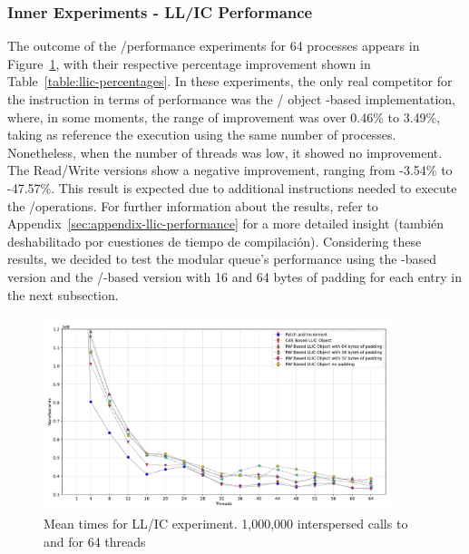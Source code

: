 \subsubsection{Inner Experiments - LL/IC Performance}

The outcome of the \LL/\IC performance experiments for 64 processes appears in Figure~\ref{fig:llic-times}, with their respective percentage improvement shown in Table~\ref{table:llic-percentages}. In these experiments, the only real competitor for the \FAI instruction in terms of performance was the \LL/\IC{} object \CAS-based implementation, where, in some moments, the range of improvement was over 0.46\% to 3.49\%, taking as reference the execution using the same number of processes. Nonetheless, when the number of threads was low, it showed no improvement. The Read/Write versions show a negative improvement, ranging from -3.54\% to -47.57\%. This result is expected due to additional instructions needed to execute the \LL/\IC operations. For further information about the results, refer to Appendix~\ref{sec:appendix-llic-performance} for a more detailed insight (también deshabilitado por cuestiones de tiempo de compilación). Considering these results, we decided to test the modular queue's performance using the \CAS-based version and the \R/\W-based version with 16 and 64 bytes of padding for each entry in the next subsection.


\begin{figure}[ht!]
  \centering
  \includegraphics[width=0.9\textwidth]{contents/figures/V_llic_64_insert_extract.pdf}
  \caption{\label{fig:llic-times} Mean times for LL/IC experiment. 1,000,000 interspersed calls to \Take and \Put for 64 threads}
\end{figure}


% 

